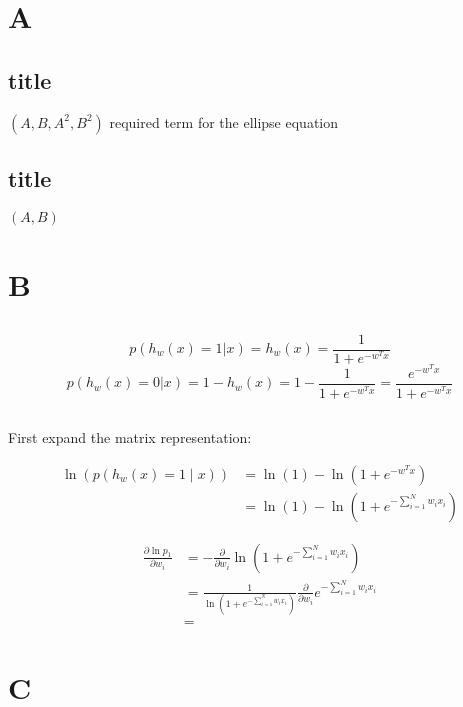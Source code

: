 \documentclass{article}
\begin{document}
\title{}
\author{Wang Xiyu}
\date{}
\maketitle

\section*{A}
\subsection*{title}
$(A, B, A^2, B^2)$ required term for the ellipse equation
\subsection*{title}
$(A, B)$

\section*{B}
\subsection*{}
\[p(h_w(x) = 1|x) = h_w(x) = \frac{1}{1 + e^{-w^Tx}}\]
\[p(h_w(x) = 0|x) = 1 - h_w(x) = 1 - \frac{1}{1 + e^{-w^Tx}} = \frac{e^{-w^Tx}}{1 + e^{-w^Tx}}\]
\subsection*{}
First expand the matrix representation:

\begin{align*}
  \ln \left( p(h_w(x) = 1 \mid x) \right) 
      &= \ln(1) - \ln \left( 1 + e^{-w^T x} \right) \\
      &= \ln(1) - \ln \left( 1 + e^{-\sum_{i = 1}^{N} w_i x_i} \right)
  \end{align*}
  
  \begin{align*}
  \frac{\partial \ln p_1}{\partial w_i} 
      &= -\frac{\partial}{\partial w_i} \ln ( 1 + e^{-\sum_{i = 1}^{N} w_i x_i} ) \\
      &= \frac{1}{\ln ( 1 + e^{-\sum_{i = 1}^{N} w_i x_i} )} 
         \frac{\partial}{\partial w_i} e^{-\sum_{i = 1}^{N} w_i x_i}\\
      &= 
  \end{align*}

\section*{C}
\subsection*{}



\end{document}
